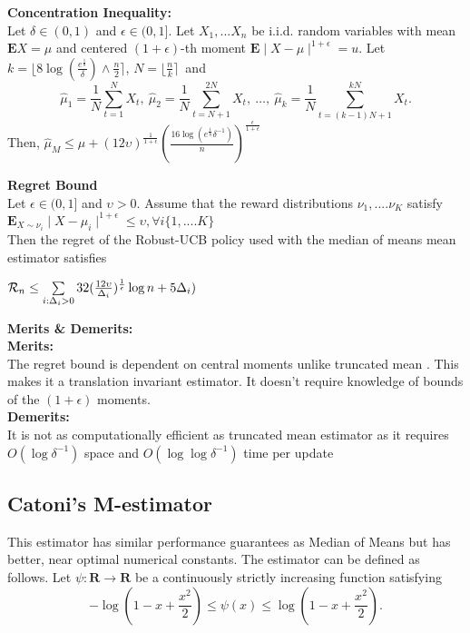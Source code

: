 \documentclass[11pt]{article}
\begin{document}
\begin{flushleft}
\textbf{Concentration Inequality:}\\
Let $\delta \in (0,1)$ and $\epsilon \in (0,1]$. Let $X_{1},...X_{n}$
be i.i.d. random variables with mean $\mathbf{E}X = \mu$
and centered $(1+\epsilon)$-th  moment $\mathbf{E}\mid X-\mu \mid^{1+\epsilon} = u $.
Let $k = \lfloor 8 \log(\frac {e^{\frac{1}{8}}}{\delta})\wedge \frac{n}{2}\rceil $, $ N =\lfloor \frac{n}{k} \rceil$\
and
$$\hat\mu_{1} = \frac{1}{N}\sum\limits^{N}_{t =1}X_{t},\
\hat\mu_{2} = \frac{1}{N}\sum\limits^{2N}_{t =N+1}X_{t} ,\ \ldots,\ \hat\mu_{k} = \frac{1}{N}\sum\limits^{kN}_{t =(k-1)N+1}X_{t} .$$
Then,
$\hat\mu_{M} \leq \mu  + 
(12\upsilon)^{\frac{1}{1+\epsilon}}(\frac{16\log(e^{\frac{1}{8}}\delta^{-1})}{n})^{\frac{\epsilon}{1+\epsilon}}$ \\
\end{flushleft}
\begin{flushleft}
\textbf{Regret Bound}\\
Let $\epsilon \in (0,1]$ and  $\upsilon > 0$. Assume that the reward distributions $\nu_{1} ,....\nu_{K}$ satisfy \\
$\mathbf{E}_{X\sim\nu_{i}}\mid X-\mu_{i} \mid^{1+\epsilon} \leq \upsilon ,\forall i  \{1,....K\}$\\
Then the regret of the Robust-UCB policy used with the median of means mean estimator satisfies 
\end{flushleft}
$\mathcal{R}_{n} \leq \sum\limits_{i: \Delta_{i} >0} 32(\frac{12\upsilon}{\Delta_{i}})^{\frac{1}{\epsilon}}\log n + 5\Delta_{i})$
\begin{flushleft}
\textbf{Merits \& Demerits:}\\
\textbf{Merits:}\\ The regret bound is dependent on central moments unlike truncated mean . This makes it a translation invariant estimator. It doesn't require knowledge of bounds of the $(1+\epsilon)$ moments.\\
\textbf{Demerits:}\\
It is not as computationally efficient as truncated mean estimator as it requires $O(\log\delta^{-1})$ space and $O(\log\log\delta^{-1})$ time per update
\end{flushleft}


\subsection{Catoni's M-estimator}

This estimator has similar performance guarantees as Median of Means but has better, near optimal numerical constants.
The estimator can be defined as follows.
Let $\psi : \mathbf{R} \rightarrow  \mathbf{R} $ be a continuously strictly increasing function satisfying
$$-\log(1-x + \frac{x^{2}}{2}) \leq \psi(x) \leq \log(1-x + \frac{x^{2}}{2}) .$$
\end{document}
